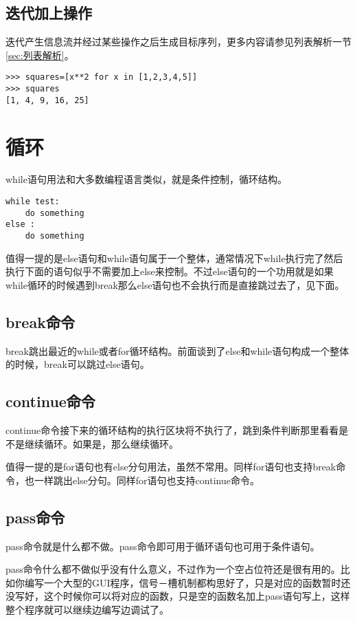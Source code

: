 \documentclass[12pt,oneside]{book}
\begin{document}
\begin{common-format}
\subsection{迭代加上操作}
迭代产生信息流并经过某些操作之后生成目标序列，更多内容请参见列表解析一节\ref{sec:列表解析}。
\begin{Verbatim}
>>> squares=[x**2 for x in [1,2,3,4,5]]
>>> squares
[1, 4, 9, 16, 25]
\end{Verbatim}




\section{循环}
while语句用法和大多数编程语言类似，就是条件控制，循环结构。
\begin{Verbatim}
while test:
    do something
else :
    do something
\end{Verbatim}

值得一提的是else语句和while语句属于一个整体，通常情况下while执行完了然后执行下面的语句似乎不需要加上else来控制。不过else语句的一个功用就是如果while循环的时候遇到break那么else语句也不会执行而是直接跳过去了，见下面。

\subsection{break命令}
break跳出最近的while或者for循环结构。前面谈到了else和while语句构成一个整体的时候，break可以跳过else语句。

\subsection{continue命令}
continue命令接下来的循环结构的执行区块将不执行了，跳到条件判断那里看看是不是继续循环。如果是，那么继续循环。

值得一提的是for语句也有else分句用法，虽然不常用。同样for语句也支持break命令，也一样跳出else分句。同样for语句也支持continue命令。

\subsection{pass命令}
pass命令就是什么都不做。pass命令即可用于循环语句也可用于条件语句。

pass命令什么都不做似乎没有什么意义，不过作为一个空占位符还是很有用的。比如你编写一个大型的GUI程序，信号－槽机制都构思好了，只是对应的函数暂时还没写好，这个时候你可以将对应的函数，只是空的函数名加上pass语句写上，这样整个程序就可以继续边编写边调试了。





\end{common-format}
\end{document}
